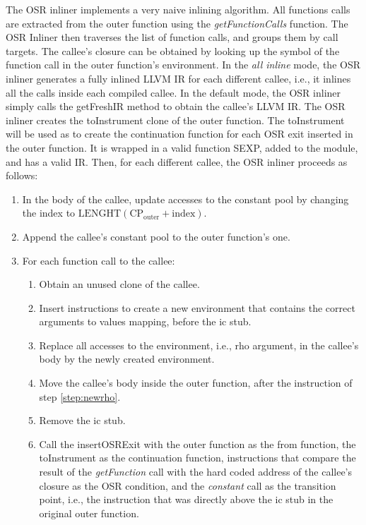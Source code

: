 The OSR inliner implements a very naive inlining algorithm.
All functions calls are extracted from the outer function using the \textit{getFunctionCalls} function.
The OSR Inliner then traverses the list of function calls, and groups them by call targets.
The callee's closure can be obtained by looking up the symbol of the function call in the outer function's environment.
In the \textit{all inline} mode, the OSR inliner generates a fully inlined LLVM IR for each different callee, i.e., it inlines all the calls inside each compiled callee. 
In the default mode, the OSR inliner simply calls the getFreshIR method to obtain the callee's LLVM IR.
The OSR inliner creates the toInstrument clone of the outer function.
The toInstrument will be used as to create the continuation function for each OSR exit inserted in the outer function.
It is wrapped in a valid function SEXP, added to the module, and has a valid IR.
Then, for each different callee, the OSR inliner proceeds as follows: 
\begin{enumerate}
    \item In the body of the callee, update accesses to the constant pool by changing the index to $\text{LENGHT}(\text{CP}_{\text{outer}} + \text{index})$.
    \item Append the callee's constant pool to the outer function's one.
    \item For each function call to the callee:
        \begin{enumerate}
            \item Obtain an unused clone of the callee.
            \item Insert instructions to create a new environment that contains the correct arguments to values mapping, before the ic stub.\label{step:newrho}
            \item Replace all accesses to the environment, i.e., rho argument, in the callee's body by the newly created environment.
            \item Move the callee's body inside the outer function, after the instruction of step \ref{step:newrho}.
            \item Remove the ic stub.
            \item Call the insertOSRExit with the outer function as the from function, the toInstrument as the continuation function, instructions that compare the result of the \textit{getFunction} call with the hard coded address of the callee's closure as the OSR condition, and the \textit{constant} call as the transition point, i.e., the instruction that was directly above the ic stub in the original outer function.
        \end{enumerate}
\end{enumerate}

